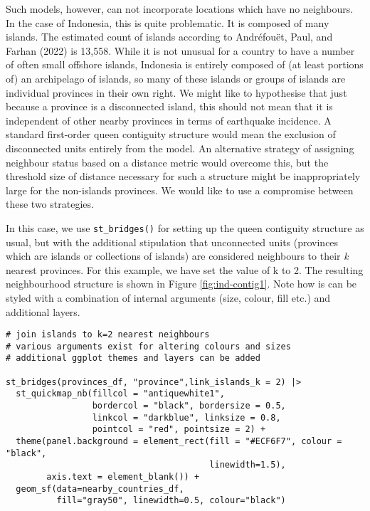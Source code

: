 Such models, however, can not incorporate locations which have no
neighbours. In the case of Indonesia, this is quite problematic. It is
composed of many islands. The estimated count of
islands according to Andréfouët, Paul, and Farhan (2022) is 13,558.
While it is not unusual for a country to have a number of often small
offshore islands, Indonesia is entirely composed of (at least portions
of) an archipelago of islands, so many of these islands or groups of
islands are individual provinces in their own right. We might like to hypothesise that just because a province is a disconnected island, this should not mean that it is independent of other nearby provinces in terms of earthquake incidence. A standard first-order queen contiguity structure would mean the exclusion of disconnected units entirely from the model. An alternative strategy of assigning neighbour status based on a distance metric would overcome this, but the threshold size of distance necessary for such a structure might be inappropriately large for the non-islands provinces. We would like to use a compromise between these two strategies.

In this case, we use \texttt{st\_bridges()} for setting up the queen contiguity
structure as usual, but with the additional stipulation that unconnected
units (provinces which are islands or collections of islands) are
considered neighbours to their \emph{k} nearest provinces. For this example,
we have set the value of k to 2. The resulting neighbourhood structure
is shown in Figure \ref{fig:ind-contig1}. Note how is can be styled with a combination of internal arguments (size, colour, fill etc.) and additional  layers.



\begin{verbatim}
# join islands to k=2 nearest neighbours
# various arguments exist for altering colours and sizes
# additional ggplot themes and layers can be added

st_bridges(provinces_df, "province",link_islands_k = 2) |> 
  st_quickmap_nb(fillcol = "antiquewhite1", 
                 bordercol = "black", bordersize = 0.5, 
                 linkcol = "darkblue", linksize = 0.8, 
                 pointcol = "red", pointsize = 2) + 
  theme(panel.background = element_rect(fill = "#ECF6F7", colour = "black", 
                                        linewidth=1.5),
        axis.text = element_blank()) +
  geom_sf(data=nearby_countries_df, 
          fill="gray50", linewidth=0.5, colour="black")
\end{verbatim}

